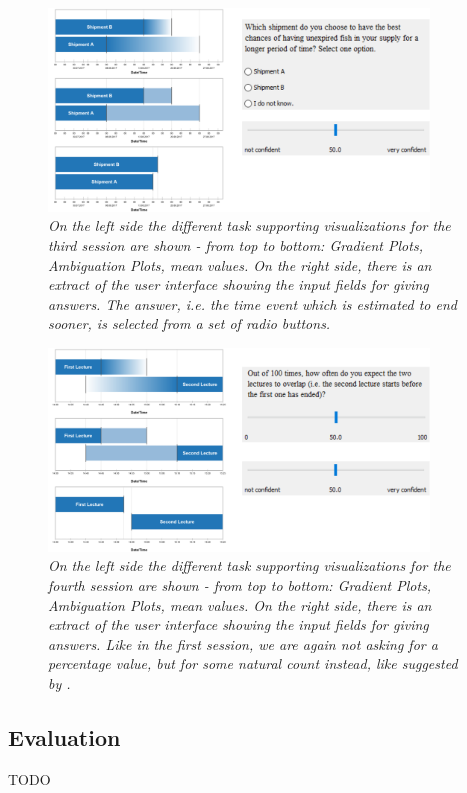 \begin{figure}[H]
	\centering
	\includegraphics[width=0.9\textwidth]{figures/EvalBench_session3.png}
	\caption{\textit{On the left side the different task supporting visualizations for the third session are shown - from top to bottom: Gradient Plots, Ambiguation Plots, mean values. On the right side, there is an extract of the user interface showing the input fields for giving answers. The answer, i.e. the time event which is estimated to end sooner, is selected from a set of radio buttons.}}
	\label{fig:EvalBench_session3}
\end{figure}

\begin{figure}[H]
	\centering
	\includegraphics[width=0.9\textwidth]{figures/EvalBench_session4.png}
	\caption{\textit{On the left side the different task supporting visualizations for the fourth session are shown - from top to bottom: Gradient Plots, Ambiguation Plots, mean values. On the right side, there is an extract of the user interface showing the input fields for giving answers. Like in the first session, we are again not asking for a percentage value, but for some natural count instead, like suggested by \citet{hullman2016evaluating}.}}
	\label{fig:EvalBench_session4}
\end{figure}

\subsection*{Evaluation}
TODO